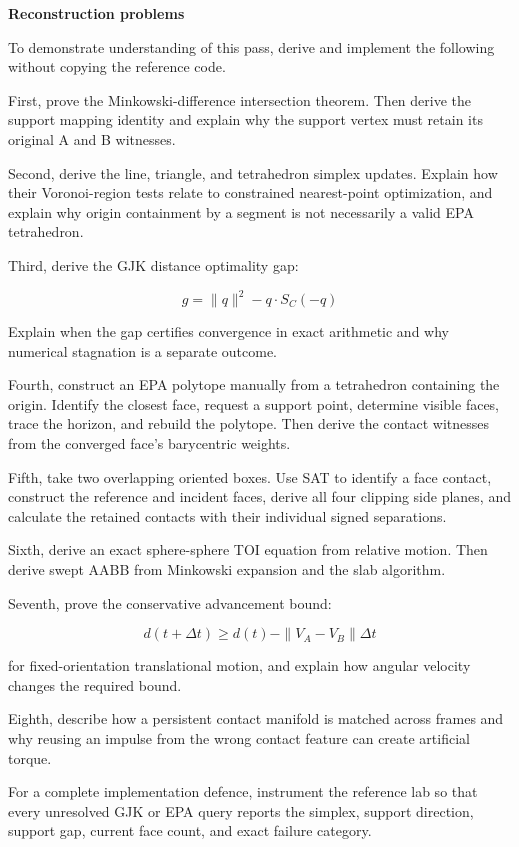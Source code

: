 \hypertarget{04-visual-computing-ii-ch026-reconstruction-and-mastery-gate}{}

\textbf{Reconstruction problems}

To demonstrate understanding of this pass, derive and implement the following without copying the reference code.

First, prove the Minkowski-difference intersection theorem. Then derive the support mapping identity and explain why the support vertex must retain its original A and B witnesses.

Second, derive the line, triangle, and tetrahedron simplex updates. Explain how their Voronoi-region tests relate to constrained nearest-point optimization, and explain why origin containment by a segment is not necessarily a valid EPA tetrahedron.

Third, derive the GJK distance optimality gap:

\[
g=\|q\|^2-q\cdot S_C(-q)
\]

Explain when the gap certifies convergence in exact arithmetic and why numerical stagnation is a separate outcome.

Fourth, construct an EPA polytope manually from a tetrahedron containing the origin. Identify the closest face, request a support point, determine visible faces, trace the horizon, and rebuild the polytope. Then derive the contact witnesses from the converged face's barycentric weights.

Fifth, take two overlapping oriented boxes. Use SAT to identify a face contact, construct the reference and incident faces, derive all four clipping side planes, and calculate the retained contacts with their individual signed separations.

Sixth, derive an exact sphere-sphere TOI equation from relative motion. Then derive swept AABB from Minkowski expansion and the slab algorithm.

Seventh, prove the conservative advancement bound:

\[
d(t+\Delta t)\ge d(t)-\|V_A-V_B\|\Delta t
\]

for fixed-orientation translational motion, and explain how angular velocity changes the required bound.

Eighth, describe how a persistent contact manifold is matched across frames and why reusing an impulse from the wrong contact feature can create artificial torque.

For a complete implementation defence, instrument the reference lab so that every unresolved GJK or EPA query reports the simplex, support direction, support gap, current face count, and exact failure category.

